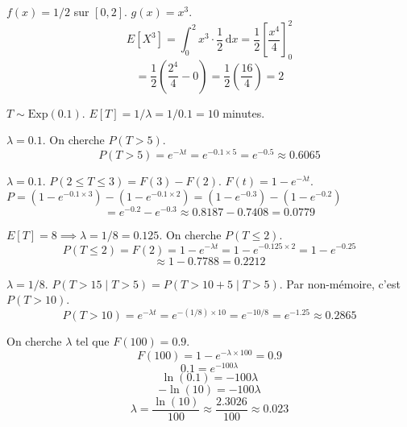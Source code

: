 \begin{correctionbox}
$f(x) = 1/2$ sur $[0, 2]$. $g(x) = x^3$.
$$E[X^3] = \int_0^2 x^3 \cdot \frac{1}{2} \, \mathrm{d}x = \frac{1}{2} \left[ \frac{x^4}{4} \right]_0^2$$
$$= \frac{1}{2} \left( \frac{2^4}{4} - 0 \right) = \frac{1}{2} \left( \frac{16}{4} \right) = 2$$
\end{correctionbox}

\begin{correctionbox}
$T \sim \text{Exp}(0.1)$.
$E[T] = 1/\lambda = 1/0.1 = 10$ minutes.
\end{correctionbox}

\begin{correctionbox}
$\lambda = 0.1$. On cherche $P(T > 5)$.
$$P(T > 5) = e^{-\lambda t} = e^{-0.1 \times 5} = e^{-0.5} \approx 0.6065$$
\end{correctionbox}

\begin{correctionbox}
$\lambda = 0.1$. $P(2 \le T \le 3) = F(3) - F(2)$.
$F(t) = 1 - e^{-\lambda t}$.
$P = (1 - e^{-0.1 \times 3}) - (1 - e^{-0.1 \times 2}) = (1 - e^{-0.3}) - (1 - e^{-0.2})$
$$= e^{-0.2} - e^{-0.3} \approx 0.8187 - 0.7408 = 0.0779$$
\end{correctionbox}

\begin{correctionbox}
$E[T] = 8 \implies \lambda = 1/8 = 0.125$.
On cherche $P(T \le 2)$.
$$P(T \le 2) = F(2) = 1 - e^{-\lambda t} = 1 - e^{-0.125 \times 2} = 1 - e^{-0.25}$$
$$\approx 1 - 0.7788 = 0.2212$$
\end{correctionbox}

\begin{correctionbox}
$\lambda = 1/8$. $P(T > 15 \mid T > 5) = P(T > 10+5 \mid T > 5)$.
Par non-mémoire, c'est $P(T > 10)$.
$$P(T > 10) = e^{-\lambda t} = e^{-(1/8) \times 10} = e^{-10/8} = e^{-1.25} \approx 0.2865$$
\end{correctionbox}

\begin{correctionbox}
On cherche $\lambda$ tel que $F(100) = 0.9$.
$$F(100) = 1 - e^{-\lambda \times 100} = 0.9$$
$$0.1 = e^{-100\lambda}$$
$$\ln(0.1) = -100\lambda$$
$$-\ln(10) = -100\lambda$$
$$\lambda = \frac{\ln(10)}{100} \approx \frac{2.3026}{100} \approx 0.023$$
\end{correctionbox}

